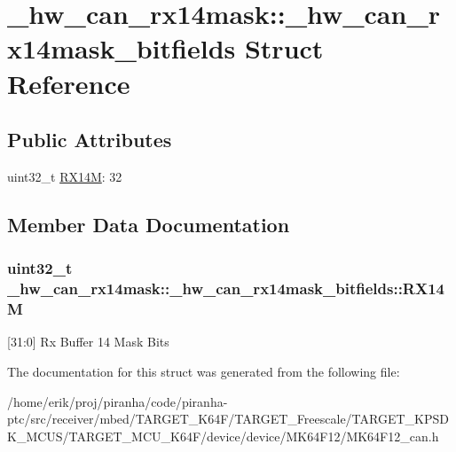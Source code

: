 \hypertarget{struct__hw__can__rx14mask_1_1__hw__can__rx14mask__bitfields}{}\section{\+\_\+hw\+\_\+can\+\_\+rx14mask\+:\+:\+\_\+hw\+\_\+can\+\_\+rx14mask\+\_\+bitfields Struct Reference}
\label{struct__hw__can__rx14mask_1_1__hw__can__rx14mask__bitfields}
\subsection*{Public Attributes}
\begin{DoxyCompactItemize}
\item 
uint32\+\_\+t \hyperlink{struct__hw__can__rx14mask_1_1__hw__can__rx14mask__bitfields_a0fdbc0ca92da1315963c716f336c07a6}{R\+X14M}\+: 32
\end{DoxyCompactItemize}


\subsection{Member Data Documentation}
\subsubsection[{\texorpdfstring{R\+X14M}{RX14M}}]{\setlength{\rightskip}{0pt plus 5cm}uint32\+\_\+t \+\_\+hw\+\_\+can\+\_\+rx14mask\+::\+\_\+hw\+\_\+can\+\_\+rx14mask\+\_\+bitfields\+::\+R\+X14M}\hypertarget{struct__hw__can__rx14mask_1_1__hw__can__rx14mask__bitfields_a0fdbc0ca92da1315963c716f336c07a6}{}\label{struct__hw__can__rx14mask_1_1__hw__can__rx14mask__bitfields_a0fdbc0ca92da1315963c716f336c07a6}
\mbox{[}31\+:0\mbox{]} Rx Buffer 14 Mask Bits 

The documentation for this struct was generated from the following file\+:\begin{DoxyCompactItemize}
\item 
/home/erik/proj/piranha/code/piranha-\/ptc/src/receiver/mbed/\+T\+A\+R\+G\+E\+T\+\_\+\+K64\+F/\+T\+A\+R\+G\+E\+T\+\_\+\+Freescale/\+T\+A\+R\+G\+E\+T\+\_\+\+K\+P\+S\+D\+K\+\_\+\+M\+C\+U\+S/\+T\+A\+R\+G\+E\+T\+\_\+\+M\+C\+U\+\_\+\+K64\+F/device/device/\+M\+K64\+F12/M\+K64\+F12\+\_\+can.\+h\end{DoxyCompactItemize}

